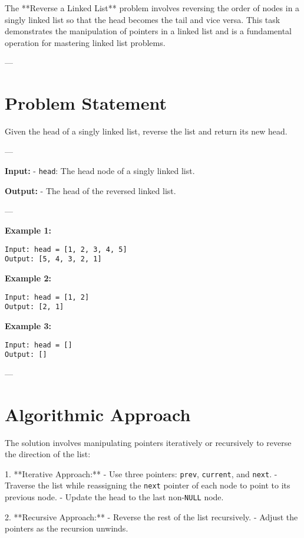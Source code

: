 
\label{problem:Reverse_Linked_List}

The **Reverse a Linked List** problem involves reversing the order of nodes in a singly linked list so that the head becomes the tail and vice versa. This task demonstrates the manipulation of pointers in a linked list and is a fundamental operation for mastering linked list problems.

---

\section*{Problem Statement}
Given the head of a singly linked list, reverse the list and return its new head.

---

\textbf{Input:}
- \texttt{head}: The head node of a singly linked list.

\textbf{Output:}
- The head of the reversed linked list.

---

\textbf{Example 1:}
\begin{verbatim}
Input: head = [1, 2, 3, 4, 5]
Output: [5, 4, 3, 2, 1]
\end{verbatim}

\textbf{Example 2:}
\begin{verbatim}
Input: head = [1, 2]
Output: [2, 1]
\end{verbatim}

\textbf{Example 3:}
\begin{verbatim}
Input: head = []
Output: []
\end{verbatim}

---

\section*{Algorithmic Approach}
The solution involves manipulating pointers iteratively or recursively to reverse the direction of the list:

1. **Iterative Approach:**
   - Use three pointers: \texttt{prev}, \texttt{current}, and \texttt{next}.
   - Traverse the list while reassigning the \texttt{next} pointer of each node to point to its previous node.
   - Update the head to the last non-\texttt{NULL} node.

2. **Recursive Approach:**
   - Reverse the rest of the list recursively.
   - Adjust the pointers as the recursion unwinds.

